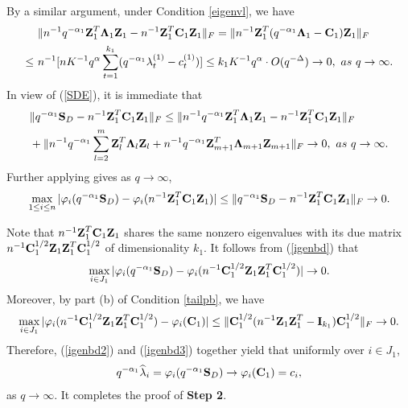 \documentclass{statsoc}
\newcommand{\bC}{\mbox{\bf C}}
\newcommand{\bI}{\mbox{\bf I}}
\newcommand{\bS}{\mbox{\bf S}}
\newcommand{\bZ}{\mbox{\bf Z}}
\newcommand{\bLambda}{\mbox{\boldmath $\Lambda$}}
\def\t{^T}
\begin{document}
By a similar argument, under Condition \ref{eigenvl}, we have
\begin{align}\label{convZ1}
&\|n^{-1}q^{-\alpha_1} \bZ_1\t \bLambda_1 \bZ_1 - n^{-1}\bZ_1\t\bC_1 \bZ_1\|_F = \|n^{-1} \bZ_1\t (q^{-\alpha_1}\bLambda_1 - \bC_1) \bZ_1\|_F \nonumber\\
\leq \ &n^{-1} [n K^{-1} q^{\alpha} \sum_{t = 1}^{k_1}(q^{-\alpha_1} \lambda_t^{(1)} - c_t^{(1)})] \leq  k_1 K^{-1} q^{\alpha} \cdot O(q^{-\Delta}) \to 0, \ as \ q \to \infty.
\end{align}
In view of (\ref{SDE}), it is immediate that
\begin{align}\label{Fconv}
&\|q^{-\alpha_1}\bS_D - n^{-1}\bZ_1\t\bC_1 \bZ_1\|_F \leq \|n^{-1}q^{-\alpha_1} \bZ_1\t \bLambda_1 \bZ_1 - n^{-1}\bZ_1\t\bC_1 \bZ_1\|_F \nonumber\\
& + \|n^{-1}q^{-\alpha_1} \sum_{l = 2}^{m} \bZ_l\t \bLambda_l \bZ_l + n^{-1}q^{-\alpha_1} \bZ_{m + 1}\t \bLambda_{m + 1} \bZ_{m + 1}\|_F \to 0, \ as \ q \to \infty.
\end{align}
Further applying \cite[Corollary 6.3.8]{Horn1990} gives as $q \to \infty$,
\begin{align}\label{igenbd}
\max_{1 \leq i \leq n}|\varphi_i(q^{-\alpha_1}\bS_D) - \varphi_i(n^{-1}\bZ_1\t\bC_1 \bZ_1)| \leq \|q^{-\alpha_1}\bS_D - n^{-1}\bZ_1\t\bC_1 \bZ_1\|_F \to 0.
\end{align}

Note that $n^{-1}\bZ_1\t\bC_1 \bZ_1$ shares the same nonzero eigenvalues with its due matrix $n^{-1}\bC_1^{1/2}\bZ_1 \bZ_1\t \bC_1^{1/2}$ of dimensionality $k_1$. It follows from (\ref{igenbd}) that
\begin{align}\label{igenbd2}
\max_{i \in J_1}|\varphi_i(q^{-\alpha_1}\bS_D) - \varphi_i(n^{-1}\bC_1^{1/2}\bZ_1 \bZ_1\t \bC_1^{1/2})| \to 0.
\end{align}
Moreover, by part (b) of Condition \ref{tailpb}, we have
\begin{align}\label{igenbd3}
\max_{i \in J_1}|\varphi_i(n^{-1}\bC_1^{1/2}\bZ_1 \bZ_1\t \bC_1^{1/2}) - \varphi_i(\bC_1)| \leq \|\bC_1^{1/2} (n^{-1}\bZ_1 \bZ_1\t - \bI_{k_1}) \bC_1^{1/2}\|_F \to 0.
\end{align}
Therefore, (\ref{igenbd2}) and (\ref{igenbd3}) together yield that uniformly over $i \in J_1$,
\begin{align*}
q^{-\alpha_1} \widehat{\lambda}_i = \varphi_i(q^{-\alpha_1}\bS_D) \to \varphi_i(\bC_1) = c_i,
\end{align*}
as $q \to \infty$. It completes the proof of \textbf{Step 2}.
\end{document}
